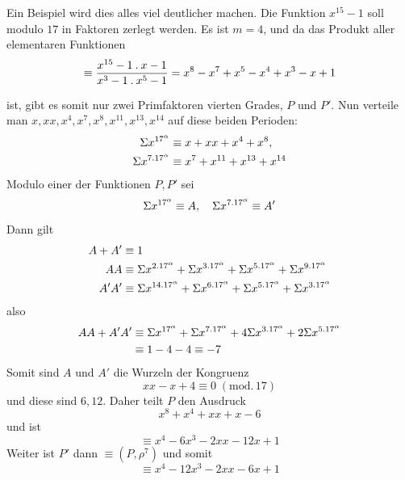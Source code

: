 Ein Beispiel wird dies alles viel deutlicher machen. Die Funktion $x^{15}-1$ soll modulo $17$ in Faktoren zerlegt werden. Es ist $m=4$, und da das Produkt aller elementaren Funktionen
\[
\equiv\frac{x^{15}-1\mathbin{.} x-1}{x^3-1\mathbin{.} x^5-1}=x^8-x^7+x^5-x^4+x^3-x+1
\]

ist, gibt es somit nur zwei Primfaktoren vierten Grades, $P$ und $P'$. Nun verteile man $x,xx,x^4,x^7,x^8,x^{11},x^{13},x^{14}$ auf diese beiden Perioden:
\[
\begin{aligned}
\Sigma x^{17^\alpha}&\equiv x+xx+x^4+x^8,\\
\Sigma x^{7\mathbin{.}17^\alpha}&\equiv x^7+x^{11}+x^{13}+x^{14}
\end{aligned}
\]
Modulo einer der Funktionen $P,P'$ sei
\[
\Sigma x^{17^\alpha}\equiv A,\quad\Sigma x^{7\mathbin{.}17^\alpha}\equiv A'
\]
Dann gilt
\[
\begin{aligned}
A+A'&\equiv1\\
AA&\equiv\Sigma x^{2\mathbin{.}17^\alpha}+\Sigma x^{3\mathbin{.}17^\alpha}+\Sigma x^{5\mathbin{.}17^\alpha}+\Sigma x^{9\mathbin{.}17^\alpha}\\
A'A'&\equiv\Sigma x^{14\mathbin{.}17^\alpha}+\Sigma x^{6\mathbin{.}17^\alpha}+\Sigma x^{5\mathbin{.}17^\alpha}+\Sigma x^{3\mathbin{.}17^\alpha}
\end{aligned}
\]
also
\[
\begin{aligned}
AA+A'A'&\equiv\Sigma x^{17^\alpha}+\Sigma x^{7\mathbin{.}17^\alpha}+4\Sigma x^{3\mathbin{.}17^\alpha}+2\Sigma x^{5\mathbin{.}17^\alpha}\\
&\equiv1-4-4\equiv-7
\end{aligned}
\]
Somit sind $A$ und $A'$ die Wurzeln der Kongruenz
\[
xx-x+4\equiv0\;(\mathrm{mod.}\,17)
\]
und diese sind $6,12$. Daher teilt $P$ den Ausdruck
\[
x^8+x^4+xx+x-6
\]
und ist
\[
\equiv x^4-6x^3-2xx-12x+1
\]
Weiter ist $P'$ dann $\equiv(P,\rho^7)$ und somit
\[
\equiv x^4-12x^3-2xx-6x+1
\]
